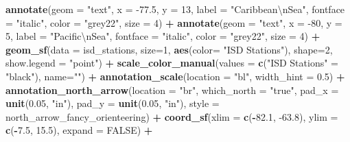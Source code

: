 \documentclass[12pt,oneside]{reedthesis}
\newenvironment{Shaded}{\begin{snugshade}}{\end{snugshade}}
\newcommand{\CharTok}[1]{\textcolor[rgb]{0.31,0.60,0.02}{#1}}
\newcommand{\DataTypeTok}[1]{\textcolor[rgb]{0.13,0.29,0.53}{#1}}
\newcommand{\DecValTok}[1]{\textcolor[rgb]{0.00,0.00,0.81}{#1}}
\newcommand{\FloatTok}[1]{\textcolor[rgb]{0.00,0.00,0.81}{#1}}
\newcommand{\KeywordTok}[1]{\textcolor[rgb]{0.13,0.29,0.53}{\textbf{#1}}}
\newcommand{\NormalTok}[1]{#1}
\newcommand{\OperatorTok}[1]{\textcolor[rgb]{0.81,0.36,0.00}{\textbf{#1}}}
\newcommand{\OtherTok}[1]{\textcolor[rgb]{0.56,0.35,0.01}{#1}}
\newcommand{\StringTok}[1]{\textcolor[rgb]{0.31,0.60,0.02}{#1}}
\begin{document}
\begin{Shaded}
\begin{Highlighting}[]
\StringTok{  }\KeywordTok{annotate}\NormalTok{(}\DataTypeTok{geom =} \StringTok{"text"}\NormalTok{, }\DataTypeTok{x =} \FloatTok{-77.5}\NormalTok{, }\DataTypeTok{y =} \DecValTok{13}\NormalTok{, }\DataTypeTok{label =} \StringTok{"Caribbean}\CharTok{\textbackslash{}n}\StringTok{Sea"}\NormalTok{, }\DataTypeTok{fontface =} \StringTok{"italic"}\NormalTok{, }\DataTypeTok{color =} \StringTok{"grey22"}\NormalTok{, }\DataTypeTok{size =} \DecValTok{4}\NormalTok{) }\OperatorTok{+}\StringTok{ }
\StringTok{  }\KeywordTok{annotate}\NormalTok{(}\DataTypeTok{geom =} \StringTok{"text"}\NormalTok{, }\DataTypeTok{x =} \DecValTok{-80}\NormalTok{, }\DataTypeTok{y =} \DecValTok{5}\NormalTok{, }\DataTypeTok{label =} \StringTok{"Pacific}\CharTok{\textbackslash{}n}\StringTok{Sea"}\NormalTok{, }\DataTypeTok{fontface =} \StringTok{"italic"}\NormalTok{, }\DataTypeTok{color =} \StringTok{"grey22"}\NormalTok{, }\DataTypeTok{size =} \DecValTok{4}\NormalTok{) }\OperatorTok{+}
\StringTok{  }\KeywordTok{geom_sf}\NormalTok{(}\DataTypeTok{data =}\NormalTok{ isd_stations, }\DataTypeTok{size=}\DecValTok{1}\NormalTok{, }\KeywordTok{aes}\NormalTok{(}\DataTypeTok{color=} \StringTok{"ISD Stations"}\NormalTok{), }\DataTypeTok{shape=}\DecValTok{2}\NormalTok{, }\DataTypeTok{show.legend =} \StringTok{"point"}\NormalTok{) }\OperatorTok{+}\StringTok{ }
\StringTok{  }\KeywordTok{scale_color_manual}\NormalTok{(}\DataTypeTok{values =} \KeywordTok{c}\NormalTok{(}\StringTok{"ISD Stations"}\NormalTok{ =}\StringTok{ "black"}\NormalTok{), }\DataTypeTok{name=}\StringTok{""}\NormalTok{) }\OperatorTok{+}
\StringTok{  }\KeywordTok{annotation_scale}\NormalTok{(}\DataTypeTok{location =} \StringTok{"bl"}\NormalTok{, }\DataTypeTok{width_hint =} \FloatTok{0.5}\NormalTok{) }\OperatorTok{+}\StringTok{ }
\StringTok{  }\KeywordTok{annotation_north_arrow}\NormalTok{(}\DataTypeTok{location =} \StringTok{"br"}\NormalTok{, }\DataTypeTok{which_north =} \StringTok{"true"}\NormalTok{, }\DataTypeTok{pad_x =} \KeywordTok{unit}\NormalTok{(}\FloatTok{0.05}\NormalTok{, }\StringTok{"in"}\NormalTok{), }\DataTypeTok{pad_y =} \KeywordTok{unit}\NormalTok{(}\FloatTok{0.05}\NormalTok{, }\StringTok{"in"}\NormalTok{), }
   \DataTypeTok{style =}\NormalTok{ north_arrow_fancy_orienteering) }\OperatorTok{+}\StringTok{ }
\StringTok{  }\KeywordTok{coord_sf}\NormalTok{(}\DataTypeTok{xlim =} \KeywordTok{c}\NormalTok{(}\OperatorTok{-}\FloatTok{82.1}\NormalTok{, }\FloatTok{-63.8}\NormalTok{), }\DataTypeTok{ylim =} \KeywordTok{c}\NormalTok{(}\OperatorTok{-}\FloatTok{7.5}\NormalTok{, }\FloatTok{15.5}\NormalTok{), }\DataTypeTok{expand =} \OtherTok{FALSE}\NormalTok{) }\OperatorTok{+}

\end{Highlighting}
\end{Shaded}
\end{document}
